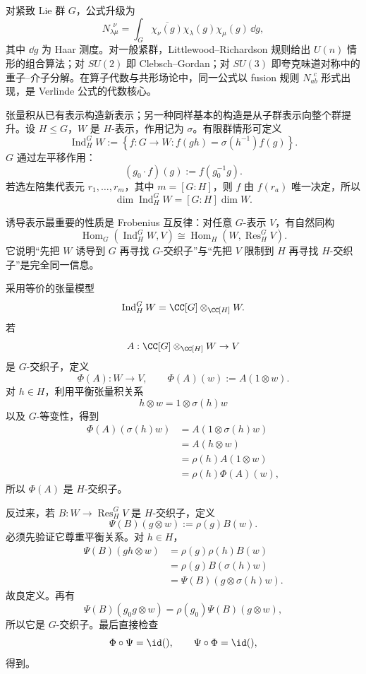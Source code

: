 对紧致 Lie 群 $G$，公式升级为
\[
N_{\lambda\mu}^{\ \ \nu}
=\int_G \overline{\chi_\nu(g)}\chi_\lambda(g)\chi_\mu(g)\,\dd g,
\]
其中 $\dd g$ 为 Haar 测度。对一般紧群，Littlewood--Richardson 规则给出 $U(n)$ 情形的组合算法；对 $SU(2)$ 即 Clebsch--Gordan；对 $SU(3)$ 即夸克味道对称中的重子--介子分解。在算子代数与共形场论中，同一公式以 fusion 规则 $N_{ab}^{\ \ c}$ 形式出现，是 Verlinde 公式的代数核心。

张量积从已有表示构造新表示；另一种同样基本的构造是从子群表示向整个群提升。设 $H\le G$，$W$ 是 $H$-表示，作用记为 $\sigma$。有限群情形可定义
\[
\operatorname{Ind}_H^G W
:=\left\{
 f:G\to W:
 f(gh)=\sigma(h^{-1})f(g)
\right\}.
\]
$G$ 通过左平移作用：
\[
(g_0\cdot f)(g)
:=f(g_0^{-1}g).
\]
若选左陪集代表元 $r_1,\ldots,r_m$，其中 $m=[G:H]$，则 $f$ 由 $f(r_a)$ 唯一决定，所以
\[
\dim\operatorname{Ind}_H^G W
=[G:H]\dim W.
\]

诱导表示最重要的性质是 Frobenius 互反律：对任意 $G$-表示 $V$，有自然同构
\begin{equation}
\boxed{
\operatorname{Hom}_G(\operatorname{Ind}_H^G W,V)
\cong
\operatorname{Hom}_H(W,\operatorname{Res}_H^G V)
}.
\label{eq:frobenius-reciprocity}
\end{equation}
它说明“先把 $W$ 诱导到 $G$ 再寻找 $G$-交织子”与“先把 $V$ 限制到 $H$ 再寻找 $H$-交织子”是完全同一信息。

采用等价的张量模型
\[
\operatorname{Ind}_H^G W
=\CC[G]\otimes_{\CC[H]}W.
\]
若
\[
A:\CC[G]\otimes_{\CC[H]}W\to V
\]
是 $G$-交织子，定义
\[
\Phi(A):W\to V,
\qquad
\Phi(A)(w):=A(1\otimes w).
\]
对 $h\in H$，利用平衡张量积关系
\[
h\otimes w=1\otimes\sigma(h)w
\]
以及 $G$-等变性，得到
\[
\begin{aligned}
\Phi(A)(\sigma(h)w)
&=A(1\otimes\sigma(h)w)\\
&=A(h\otimes w)\\
&=\rho(h)A(1\otimes w)\\
&=\rho(h)\Phi(A)(w),
\end{aligned}
\]
所以 $\Phi(A)$ 是 $H$-交织子。

反过来，若 $B:W\to\operatorname{Res}_H^G V$ 是 $H$-交织子，定义
\[
\Psi(B)(g\otimes w)
:=\rho(g)B(w).
\]
必须先验证它尊重平衡关系。对 $h\in H$，
\[
\begin{aligned}
\Psi(B)(gh\otimes w)
&=\rho(g)\rho(h)B(w)\\
&=\rho(g)B(\sigma(h)w)\\
&=\Psi(B)(g\otimes\sigma(h)w).
\end{aligned}
\]
故良定义。再有
\[
\Psi(B)(g_0g\otimes w)
=\rho(g_0)\Psi(B)(g\otimes w),
\]
所以它是 $G$-交织子。最后直接检查
\[
\Phi\circ\Psi=\id(),
\qquad
\Psi\circ\Phi=\id(),
\]
得到。

